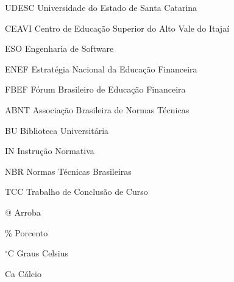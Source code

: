 
\listoffigures*
\cleardoublepage



\listoftables*
\cleardoublepage

\begin{siglas}
	\item[UDESC] Universidade do Estado de Santa Catarina
	\item[CEAVI] Centro de Educação Superior do Alto Vale do Itajaí
	\item[ESO] Engenharia de Software

	\item[ENEF] Estratégia Nacional da Educação Financeira
	\item[FBEF] Fórum Brasileiro de Educação Financeira





	\item[ABNT] Associação Brasileira de Normas Técnicas
	\item[BU] Biblioteca Universitária
	\item[IN] Instrução Normativa
	\item[NBR] Normas Técnicas Brasileiras
	\item[TCC] Trabalho de Conclusão de Curso

\end{siglas}



\begin{simbolos}
  \item[@] Arroba
  \item[\%] Porcento
  \item[$^\circ$C] Graus Celsius
  \item[Ca] Cálcio
\end{simbolos}

